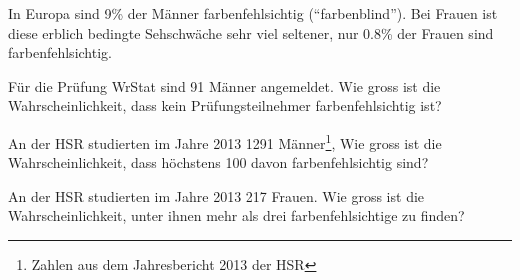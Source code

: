 In Europa sind 9\% der Männer farbenfehlsichtig (``farbenblind'').
Bei Frauen ist diese erblich bedingte Sehschwäche sehr viel seltener,
nur 0.8\% der Frauen sind farbenfehlsichtig.
\begin{teilaufgaben}
\item
Für die Prüfung WrStat sind 91 Männer angemeldet.
Wie gross ist die Wahrscheinlichkeit, dass kein Prüfungsteilnehmer
farbenfehlsichtig ist?
\item
An der HSR studierten im Jahre 2013 1291
Männer\footnote{Zahlen aus dem Jahresbericht 2013 der HSR},
Wie gross ist die Wahrscheinlichkeit, dass höchstens 100 davon
farbenfehlsichtig sind?
\item 
An der HSR studierten im Jahre 2013 217 Frauen. Wie gross ist die
Wahrscheinlichkeit, unter ihnen mehr als drei farbenfehlsichtige
zu finden?
\end{teilaufgaben}


